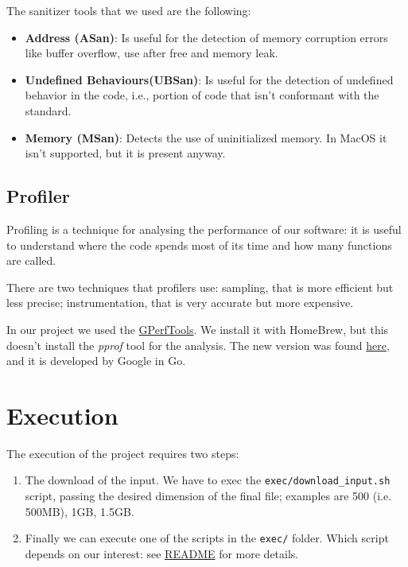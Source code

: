 \myskip

The sanitizer tools that we used are the following:
\begin{itemize}
    \item \textbf{Address (ASan)}: Is useful for the detection of memory corruption errors like buffer overflow, use after free and memory leak.
    \item \textbf{Undefined Behaviours(UBSan)}: Is useful for the detection of undefined behavior in the code, i.e., portion of code that isn't conformant with the standard.
    \item \textbf{Memory (MSan)}: Detects the use of uninitialized memory. In MacOS it isn't supported, but it is present anyway.
\end{itemize}

\subsection{Profiler}
Profiling is a technique for analysing the performance of our software: it is useful to understand where the code spends most of its time and how many functions are called.

There are two techniques that profilers use: sampling, that is more efficient but less precise; instrumentation, that is very accurate but more expensive.

\myskip

In our project we used the \href{https://developer.ridgerun.com/wiki/index.php/Profiling_with_GPerfTools}{GPerfTools}. We install it with HomeBrew, but this doesn't install the \textit{pprof} tool for the analysis. The new version was found \href{https://github.com/google/pprof}{here}, and it is developed by Google in Go.

\section{Execution}
The execution of the project requires two steps:
\begin{enumerate}
    \item The download of the input. We have to exec the \texttt{exec/download\_input.sh} script, passing the desired dimension of the final file; examples are 500 (i.e. 500MB), 1GB, 1.5GB.
    \item Finally we can execute one of the scripts in the \texttt{exec/} folder. Which script depends on our interest: see \href{https://github.com/edoardosarri24/parallel-trigrams/blob/7f22592a9d7207587b74a349d66fbb2a12994c38/README.md}{README} for more details.
\end{enumerate}